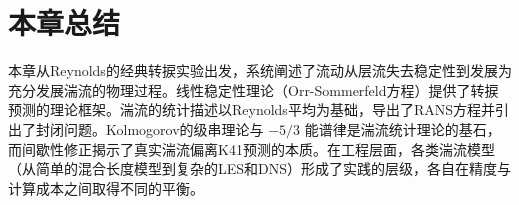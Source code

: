 \section{本章总结}

本章从Reynolds的经典转捩实验出发，系统阐述了流动从层流失去稳定性到发展为充分发展湍流的物理过程。线性稳定性理论（Orr-Sommerfeld方程）提供了转捩预测的理论框架。湍流的统计描述以Reynolds平均为基础，导出了RANS方程并引出了封闭问题。Kolmogorov的级串理论与 $-5/3$ 能谱律是湍流统计理论的基石，而间歇性修正揭示了真实湍流偏离K41预测的本质。在工程层面，各类湍流模型（从简单的混合长度模型到复杂的LES和DNS）形成了实践的层级，各自在精度与计算成本之间取得不同的平衡。
